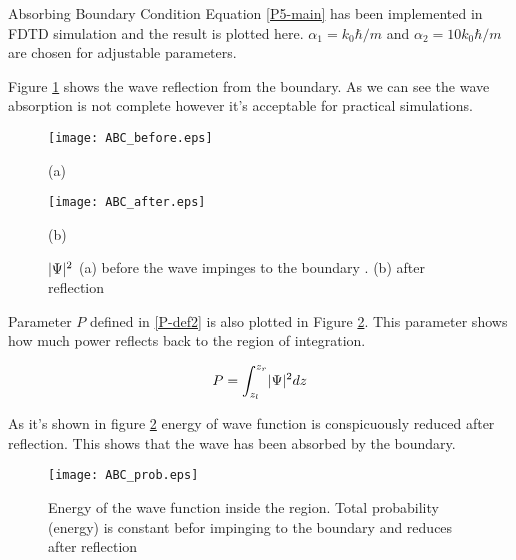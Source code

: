 \begin{homeworkProblem}
\begin{homeworkSection}{Absorbing Boundary Condition}
Equation \eqref{P5-main} has been implemented in FDTD simulation and the result is plotted here. $\alpha_1=k_0\hbar/{m}$ and $\alpha_2 =10k_0\hbar/m$ are chosen for adjustable parameters.  

Figure \ref{fig:ABC} shows the wave reflection from the boundary. As we can see the wave absorption is not complete however it's acceptable for practical simulations. 


\begin{figure}[h]
\begin{minipage}[b]{1\linewidth}
\centering
\texttt{[image: ABC\_before.eps]}
\centerline{\small (a) }
\end{minipage}
\begin{minipage}[b]{1\linewidth}
\centering
\texttt{[image: ABC\_after.eps]}
\centerline{\small (b) }
\end{minipage}
\caption { \small $\lvert\Psi\rvert^2$ (a) before the wave impinges to the boundary . (b)  after reflection} 
\label{fig:ABC}
\end{figure} 

Parameter $P$  defined in \eqref{P-def2} is also plotted in Figure \ref{fig:ABC_prob}. This parameter shows how much power reflects back to the region of integration.

\begin{equation}\label{P-def2}
P=\int_{z_l}^{z_r}\lvert\Psi\rvert^2dz
\end{equation}

As it's shown in figure \ref{fig:ABC_prob} energy of wave function is conspicuously reduced after reflection. This shows that the wave has been absorbed by the boundary.
\begin{figure}[!h]
\centering
\texttt{[image: ABC\_prob.eps]}
\caption{\small  Energy of the wave function inside the region. Total probability (energy) is constant befor impinging to the boundary and reduces after reflection }
\label{fig:ABC_prob}
\end{figure} 

\end{homeworkSection}
\end{homeworkProblem}